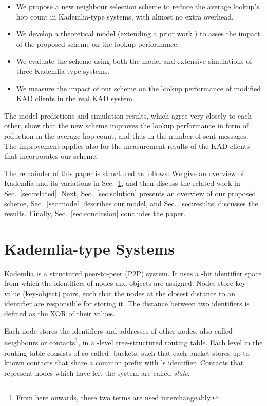 \documentclass[10pt, conference, compsocconf, letterpaper]{IEEEtran}
\begin{document}
\begin{itemize}
\item We propose a new neighbour selection scheme to reduce the average lookup's hop count in Kademlia-type systems, with almost no extra overhead. 
\item We develop a theoretical model (extending a prior work \cite{roos13comprehending}) to asses the impact of the proposed scheme on the lookup performance.
\item We evaluate the scheme using both the model and extensive simulations of three Kademlia-type systems. 
\item We measure the impact of our scheme on the lookup performance of modified KAD clients in the real KAD system.
\end{itemize}
 
The model predictions and simulation results, which agree very closely to each other, show that the new scheme improves the lookup performance in form of reduction in the average hop count, and thus in the number of sent messages. 
The improvement applies also for the measurement results of the KAD clients that incorporates our scheme.

The remainder of this paper is structured as follows: We give an overview of Kademlia and its variations in Sec.~\ref{sec:kademlia}, and then discuss the related work in Sec.~\ref{sec:related}. Next, Sec.~\ref{sec:solution} presents an overview of our proposed scheme, Sec.~\ref{sec:model} describes our model, and Sec.~\ref{sec:results} discusses the results. Finally, Sec.~\ref{sec:conclusion} concludes the paper.



\section{Kademlia-type Systems} \label{sec:kademlia}

Kademlia \cite{Maymounkov02Kademlia} is a structured peer-to-peer (P2P) system. It uses a -bit identifier space from which the identifiers of nodes and objects are assigned. Nodes store key-value (key-object) pairs, such that the nodes at the closest distance to an identifier are responsible for storing it. The distance between two identifiers is defined as the XOR of their values.  

Each node  stores the identifiers and addresses of other nodes, also called neighbours or contacts\footnote{From here onwards, these two terms are used interchangeably.}, in a -level tree-structured routing table. Each level in the routing table consists of so called -buckets, such that each bucket stores up to  known contacts that share a common prefix with 's identifier. Contacts that represent nodes which have left the system are called \emph{stale}. 
\end{document}
